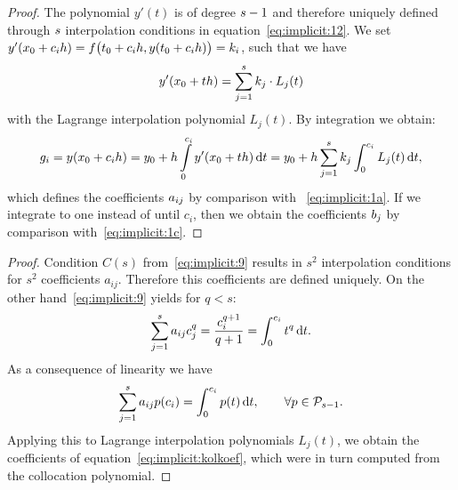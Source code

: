 


\begin{proof}
  The polynomial $y'(t)$ is of degree $s-1$ and therefore uniquely
  defined through $s$ interpolation conditions in
  equation~\eqref{eq:implicit:12}.  We set $y'(x_0 + c_i h) =
  f\bigl(t_0+c_i h, y(t_0+c_i h)\bigr) = k_i$, such that we have
  \begin{gather}
    y'(x_0+t h) = \sum\limits_{j=1}^s k_j \cdot L_j(t)
  \end{gather}
  with the Lagrange interpolation polynomial $L_j(t)$.
  By integration we obtain:
  \begin{gather}
    g_i = y(x_0 + c_i h)
    = y_0 + h \int\limits_0^{c_i} y'(x_0 + t h) \,\mathrm{d} t
    = y_0+h \sum_{j=1}^s k_j \int_0^{c_i} L_j(t)\,\mathrm{d} t,
  \end{gather}
  which defines the coefficients $a_{ij}$ by comparison with
  ~\eqref{eq:implicit:1a}.  If we integrate to one instead of until
  $c_i$, then we obtain the coefficients $b_j$ by comparison
  with~\eqref{eq:implicit:1c}.
\end{proof}




\begin{proof}
  Condition $C(s)$ from~\eqref{eq:implicit:9} results in
  $s^2$ interpolation conditions for $s^2$ coefficients $a_{ij}$.
  Therefore this coefficients are defined uniquely. On the other
  hand~\eqref{eq:implicit:9} yields for $q<s$:
  \begin{gather*}
    \sum_{j=1}^s a_{ij} c_j^q = \frac{c_i^{q+1}}{q+1} =
    \int_{0}^{c_i} t^q \,\mathrm{d} t.
  \end{gather*}
  As a consequence of linearity we have
  \begin{gather*}
    \sum_{j=1}^s a_{ij} p(c_i) = \int_{0}^{c_i} p(t)
    \,\mathrm{d} t,\qquad\forall p\in \mathcal P_{s-1}.
  \end{gather*}
  Applying this to Lagrange interpolation polynomials $L_j(t)$, we
  obtain the coefficients of equation~\eqref{eq:implicit:kolkoef},
  which were in turn computed from the collocation polynomial.
\end{proof}



